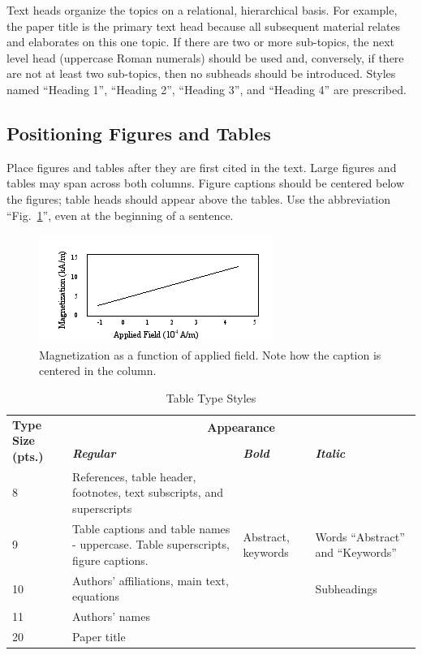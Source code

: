 \documentclass [a4paper,final,conference,10pt]{IDAACS}
\begin{document}
Text heads organize the topics on a relational, hierarchical basis. For 
example, the paper title is the primary text head because all subsequent 
material relates and elaborates on this one topic. If there are two or 
more sub-topics, the next level head (uppercase Roman numerals) should be 
used and, conversely, if there are not at least two sub-topics, then no 
subheads should be introduced. Styles named ``Heading 1'', ``Heading 2'',
``Heading 3'', and ``Heading 4'' are prescribed.

\subsection{Positioning Figures and Tables}

Place figures and tables after they are first cited in the text. Large 
figures and tables may span across both columns. Figure captions should 
be centered below the figures; table heads should appear above the tables. 
Use the abbreviation ``Fig.~\ref{Fig_Magnet}'', even at the beginning of a 
sentence.

\begin{figure}[bth]
\centering
\includegraphics[scale=0.6]{images/Fig1.png}
\caption{\label{Fig_Magnet}Magnetization as a function of applied field. Note 
how the caption is centered in the column.}
\end{figure}

\begin{table}[htb]
\caption{Table Type Styles}
\label{Table_I}
\centering
\begin{tabular}{|p{1.2cm}|p{1.5cm}|p{1.5cm}|p{1.5cm}|}
\hline
\multirow{2}{1.2cm}{\textbf{Type Size (pts.)}} & \multicolumn{3}{|c|}{\textbf{Appearance}}\\
\cline{2-4}
& \textbf{\textit{Regular}}&\textbf{\textit{Bold}}&\textbf{\textit{Italic}}\\
\hline
8 & References, table header, footnotes, text subscripts, and superscripts &&\\
\hline
9 & Table captions and table names - uppercase. Table superscripts, 
figure captions.& Abstract, keywords& Words ``Abstract'' and ``Keywords''\\
\hline 
10 & Authors' affiliations, main text, equations && Subheadings\\
\hline
11 & Authors' names &&\\
\hline
20 & Paper title &&\\
\hline
\end{tabular}
\end{table}
\end{document}
